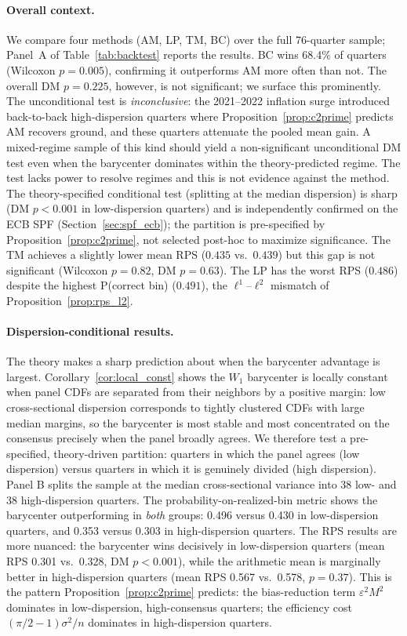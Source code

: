 \paragraph{Overall context.}
We compare four methods (AM, LP, TM, BC) over the full 76-quarter sample; Panel~A of Table~\ref{tab:backtest} reports the results.
BC wins 68.4\% of quarters (Wilcoxon $p = 0.005$), confirming it outperforms AM more often than not.
The overall DM $p = 0.225$, however, is not significant; we surface this prominently.
The unconditional test is \emph{inconclusive}: the 2021--2022 inflation surge introduced
back-to-back high-dispersion quarters where Proposition~\ref{prop:c2prime} predicts AM
recovers ground, and these quarters attenuate the pooled mean gain.
A mixed-regime sample of this kind should yield a non-significant unconditional DM test
even when the barycenter dominates within the theory-predicted regime. The test lacks
power to resolve regimes and this is not evidence against the method.
The theory-specified conditional test (splitting at the median dispersion) is sharp
(DM $p < 0.001$ in low-dispersion quarters) and is independently confirmed on the ECB SPF
(Section~\ref{sec:spf_ecb}); the partition is pre-specified by Proposition~\ref{prop:c2prime},
not selected post-hoc to maximize significance.
The TM achieves a slightly lower mean RPS ($0.435$ vs.\ $0.439$) but this gap is not significant (Wilcoxon $p = 0.82$, DM $p = 0.63$).
The LP has the worst RPS ($0.486$) despite the highest P(correct bin) ($0.491$), the $\ell^1$--$\ell^2$ mismatch of Proposition~\ref{prop:rps_l2}.

\paragraph{Dispersion-conditional results.}  The theory makes a sharp prediction about when the barycenter advantage is largest.  Corollary~\ref{cor:local_const} shows the $W_1$ barycenter is locally constant when panel CDFs are separated from their neighbors by a positive margin: low cross-sectional dispersion corresponds to tightly clustered CDFs with large median margins, so the barycenter is most stable and most concentrated on the consensus precisely when the panel broadly agrees.  We therefore test a pre-specified, theory-driven partition: quarters in which the panel agrees (low dispersion) versus quarters in which it is genuinely divided (high dispersion).  Panel B splits the sample at the median cross-sectional variance into 38 low- and 38 high-dispersion quarters.  The probability-on-realized-bin metric shows the barycenter outperforming in \emph{both} groups: 0.496 versus 0.430 in low-dispersion quarters, and 0.353 versus 0.303 in high-dispersion quarters.  The RPS results are more nuanced: the barycenter wins decisively in low-dispersion quarters (mean RPS 0.301 vs.\ 0.328, DM $p < 0.001$), while the arithmetic mean is marginally better in high-dispersion quarters (mean RPS 0.567 vs.\ 0.578, $p = 0.37$).  This is the pattern Proposition~\ref{prop:c2prime} predicts: the bias-reduction term $\varepsilon^2 M^2$ dominates in low-dispersion, high-consensus quarters; the efficiency cost $(\pi/2-1)\sigma^2/n$ dominates in high-dispersion quarters.

